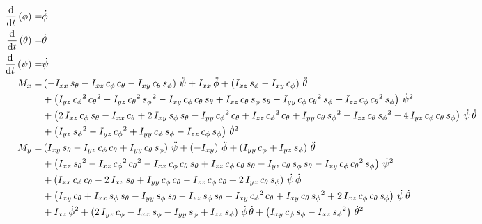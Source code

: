 \documentclass[a4paper]{article}
\begin{document}
\[
  \begin{aligned}
    \dv{t} \left( \phi \right) =& \dot{\phi} \\ 
    \dv{t} \left( \theta \right) =& \dot{\theta} \\
    \dv{t} \left( \psi \right) =& \dot{\psi} \\
    M_x =& 
\left(-I_{xx}\,s_\theta-I_{xz}\,c_\phi\,c_\theta-I_{xy}\,c_\theta\,s_\phi\right)\,\ddot{\psi}+I_{xx}\,\ddot{\phi}+\left(I_{xz}\,s_\phi-I_{xy}\,c_\phi\right)\,\ddot{\theta} \\ 
         &+\left(I_{yz}\,{c_\phi}^2\,{c_\theta}^2-I_{yz}\,{c_\theta}^2\,{s_\phi}^2-I_{xy}\,c_\phi\,c_\theta\,s_\theta+I_{xz}\,c_\theta\,s_\phi\,s_\theta-I_{yy}\,c_\phi\,{c_\theta}^2\,s_\phi+I_{zz}\,c_\phi\,{c_\theta}^2\,s_\phi\right)\,{\dot{\psi}}^2 \\
         &+\left(2\,I_{xz}\,c_\phi\,s_\theta-I_{xx}\,c_\theta+2\,I_{xy}\,s_\phi\,s_\theta-I_{yy}\,{c_\phi}^2\,c_\theta+I_{zz}\,{c_\phi}^2\,c_\theta+I_{yy}\,c_\theta\,{s_\phi}^2-I_{zz}\,c_\theta\,{s_\phi}^2-4\,I_{yz}\,c_\phi\,c_\theta\,s_\phi\right)\,\dot{\psi}\,\dot{\theta} \\
         &+\left(I_{yz}\,{s_\phi}^2-I_{yz}\,{c_\phi}^2+I_{yy}\,c_\phi\,s_\phi-I_{zz}\,c_\phi\,s_\phi\right)\,{\dot{\theta}}^2 \\
    M_y =&
\left(I_{xy}\,s_\theta-I_{yz}\,c_\phi\,c_\theta+I_{yy}\,c_\theta\,s_\phi\right)\,\ddot{\psi}+\left(-I_{xy}\right)\,\ddot{\phi}+\left(I_{yy}\,c_\phi+I_{yz}\,s_\phi\right)\,\ddot{\theta} \\
         &+\left(I_{xz}\,{s_\theta}^2-I_{xz}\,{c_\phi}^2\,{c_\theta}^2-I_{xx}\,c_\phi\,c_\theta\,s_\theta+I_{zz}\,c_\phi\,c_\theta\,s_\theta-I_{yz}\,c_\theta\,s_\phi\,s_\theta-I_{xy}\,c_\phi\,{c_\theta}^2\,s_\phi\right)\,{\dot{\psi}}^2 \\
         &+\left(I_{xx}\,c_\phi\,c_\theta-2\,I_{xz}\,s_\theta+I_{yy}\,c_\phi\,c_\theta-I_{zz}\,c_\phi\,c_\theta+2\,I_{yz}\,c_\theta\,s_\phi\right)\,\dot{\psi}\,\dot{\phi} \\
         &+\left(I_{xy}\,c_\theta+I_{xx}\,s_\phi\,s_\theta-I_{yy}\,s_\phi\,s_\theta-I_{zz}\,s_\phi\,s_\theta-I_{xy}\,{c_\phi}^2\,c_\theta+I_{xy}\,c_\theta\,{s_\phi}^2+2\,I_{xz}\,c_\phi\,c_\theta\,s_\phi\right)\,\dot{\psi}\,\dot{\theta} \\
         &+I_{xz}\,{\dot{\phi}}^2+\left(2\,I_{yz}\,c_\phi-I_{xx}\,s_\phi-I_{yy}\,s_\phi+I_{zz}\,s_\phi\right)\,\dot{\phi}\,\dot{\theta}+\left(I_{xy}\,c_\phi\,s_\phi-I_{xz}\,{s_\phi}^2\right)\,{\dot{\theta}}^2 \\

\end{aligned}\]
\end{document}
